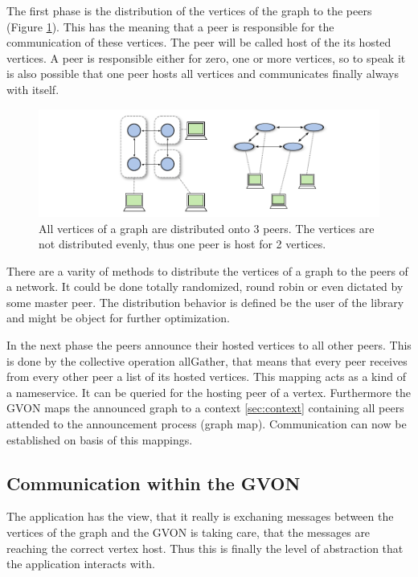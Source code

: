 The first phase is the distribution of the vertices of the graph to
the peers (Figure \ref{fig:gon_mapping}). This has the meaning that a
peer is responsible for the communication of these vertices. The peer
will be called host of the its hosted vertices. A peer is responsible
either for zero, one or more vertices, so to speak it is also possible
that one peer hosts all vertices and communicates finally always with
itself.

\begin{figure}[H]
  \centering \includegraphics[width=\textwidth]{graphics/30_gon_mapping}
  \caption{All vertices of a graph are distributed onto 3 peers. The vertices
  are not distributed evenly, thus one peer is host for 2 vertices.}
  \label{fig:gon_mapping}
\end{figure}

There are a varity of methods to distribute the vertices of a graph to
the peers of a network. It could be done totally randomized, round
robin or even dictated by some master peer. The distribution behavior
is defined be the user of the library and might be object for further
optimization.

In the next phase the peers announce their hosted vertices to all
other peers. This is done by the collective operation allGather, that
means that every peer receives from every other peer a list of its
hosted vertices. This mapping acts as a kind of a nameservice. It can
be queried for the hosting peer of a vertex. Furthermore the GVON
maps the announced graph to a context \ref{sec:context} containing
all peers attended to the announcement process (graph map). Communication can now
be established on basis of this mappings.

\subsection{Communication within the GVON}
The application has the view, that it really is exchaning messages
between the vertices of the graph and the GVON is taking care, that
the messages are reaching the correct vertex host. Thus this is
finally the level of abstraction that the application interacts with.

